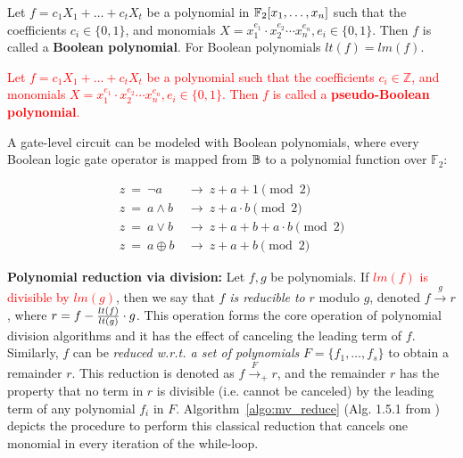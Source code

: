 \begin{Definition} 
Let $f = c_1 X_1 + \dots + c_t X_t$ be a polynomial in
${\mathbb{F}}_2[x_1,\dots,x_n]$ such that the coefficients $c_i \in \{0, 1\}$,
and monomials $X = x_1^{e_{1}}\cdot x_2^{e_{2}}\cdots x_n^{e_{n}}, e_i
\in \{0,1\}$. 
Then $f$ is called a {\bf Boolean polynomial}. For Boolean polynomials
$lt(f) = lm(f)$. 
\end{Definition}

\textcolor{red}{\begin{Definition} 
Let $f = c_1 X_1 + \dots + c_t X_t$ be a polynomial
such that the coefficients $c_i \in \mathbb{Z}$,
and monomials $X = x_1^{e_{1}}\cdot x_2^{e_{2}}\cdots x_n^{e_{n}}, e_i
\in \{0,1\}$. 
Then $f$ is called a {\bf pseudo-Boolean polynomial}.
\end{Definition}}

A gate-level circuit can be modeled with Boolean polynomials, where
every Boolean logic gate operator is mapped from ${\mathbb{B}}$ to a polynomial
function over ${\mathbb{F}}_2$: 

{\small
\begin{equation}
\label{b2poly}
\begin{split}
z ~ =  ~ \neg a ~ & \rightarrow ~ z+a+1 \pmod 2  \\
z ~ =  ~ a \wedge b ~ & \rightarrow ~ z+a\cdot b \pmod 2\\
z ~ =  ~ a \vee b ~ & \rightarrow ~ z+a+b+a\cdot b \pmod 2 \\
z ~ =  ~ a \oplus b ~ & \rightarrow ~ z+a+b \pmod 2 
\end{split}
\end{equation}
}


{\bf Polynomial reduction via division:} Let $f, g$ be polynomials. If
\textcolor{red}{$lm(f)$ is divisible by $lm(g)$}, then we say that $f$ {\it is
  reducible to} $r$ modulo $g$, denoted $f
\stackrel{g}{\textstyle\longrightarrow} r$, where $r = f - {lt(f)
  \over   lt(g)} \cdot g$. This operation forms the core operation of
polynomial division algorithms and it has the effect of canceling the
leading term of $f$. 
Similarly, $f$ can be {\it reduced 
w.r.t. a set of polynomials}  $F = \{f_1, \dots, f_s\}$ to obtain a
remainder $r$. This reduction is denoted as $f \stackrel{F} {\textstyle
  \longrightarrow}_+ r$, and the remainder $r$ has the property that
no term in $r$ is divisible (i.e. cannot be canceled) by the leading
term of any polynomial $f_i$ in $F$. Algorithm~\ref{algo:mv_reduce}
(Alg. 1.5.1 from \cite{gb_book}) depicts the procedure to perform this
classical reduction that cancels one monomial in every iteration of
the while-loop.   

